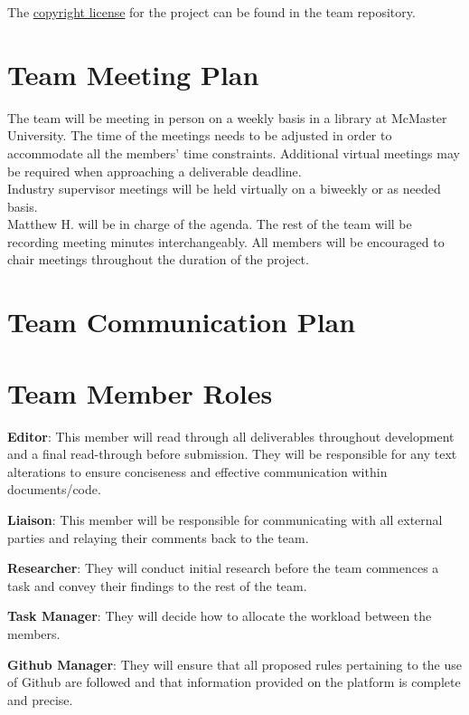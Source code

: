 \documentclass{article}
\begin{document}
The \href{https://github.com/M9Huynh/technically-functional/blob/f05da0acf59e6b8a08d67f9132471c1a17b5afef/LICENSE}{copyright license} for the project can be found in the team repository.



\section{Team Meeting Plan}

The team will be meeting in person on a weekly basis in a library at McMaster University. The time of the meetings
needs to be adjusted in order to accommodate all the members' time constraints.
Additional virtual meetings may be required when approaching a deliverable deadline.\\
Industry supervisor meetings will be held virtually on a biweekly or as needed basis. \\

Matthew H. will be in charge of the agenda. The rest of the team will be recording meeting minutes interchangeably. All members will be encouraged
to chair meetings throughout the duration of the project. 

\section{Team Communication Plan}



\section{Team Member Roles}

\textbf{Editor}: This member will read through all deliverables throughout development and a final read-through before submission. They will be responsible for any
text alterations to ensure conciseness and effective communication within documents/code.

\textbf{Liaison}: This member will be responsible for communicating with all external parties and relaying their comments back to the team.

\textbf{Researcher}: They will conduct initial research before the team commences a task and convey their findings to the rest of the team.

\textbf{Task Manager}: They will decide how to allocate the workload between the members.

\textbf{Github Manager}: They will ensure that all proposed rules pertaining to the use of Github are followed and that information provided on the platform is complete and precise.
\end{document}
